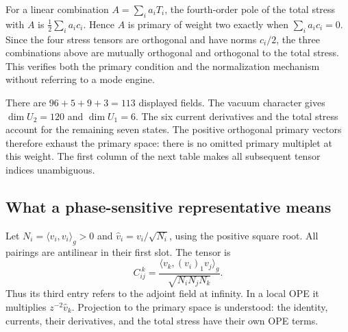 For a linear combination $A=\sum_i a_iT_i$, the fourth-order pole of
the total stress with $A$ is $\tfrac12\sum_i a_ic_i$. Hence $A$ is
primary of weight two exactly when $\sum_i a_ic_i=0$. Since the four
stress tensors are orthogonal and have norms $c_i/2$, the three
combinations above are mutually orthogonal and orthogonal to the
total stress. This verifies both the primary condition and the
normalization mechanism without referring to a mode engine.

There are $96+5+9+3=113$ displayed fields. The vacuum character gives
$\dim U_2=120$ and $\dim U_1=6$. The six current derivatives and the
total stress account for the remaining seven states. The positive
orthogonal primary vectors therefore exhaust the primary space:
there is no omitted primary multiplet at this weight. The first
column of the next table makes all subsequent tensor indices
unambiguous.



\subsection{What a phase-sensitive representative means}
\label{expphysics:phase-convention}

Let $N_i=\langle v_i,v_i\rangle_g>0$ and
$\widehat v_i=v_i/\sqrt{N_i}$, using the positive square root.
All pairings are antilinear in their first slot. The tensor is
\begin{equation}
 C_{ij}^{\ k}=
 \frac{\langle v_k,(v_i)_1v_j\rangle_g}
      {\sqrt{N_iN_jN_k}}.
 \label{expphysics:normalized-tensor}
\end{equation}
Thus its third entry refers to the adjoint field at infinity. In a
local OPE it multiplies $z^{-2}\widehat v_k$. Projection to the
primary space is understood: the identity, currents, their
derivatives, and the total stress have their own OPE terms.

